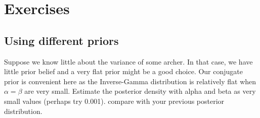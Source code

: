 %
%

\bigskip

\section{Exercises}

\subsection{Using different priors}

Suppose we know little about the variance of some archer. In that case, we have little prior belief and a very flat prior might be a good choice. Our conjugate prior is convenient here as the Inverse-Gamma distribution is relatively flat when $\alpha = \beta$ are very small. Estimate the posterior density with alpha and beta as very small values (perhaps try 0.001). compare with your previous posterior distribution.

